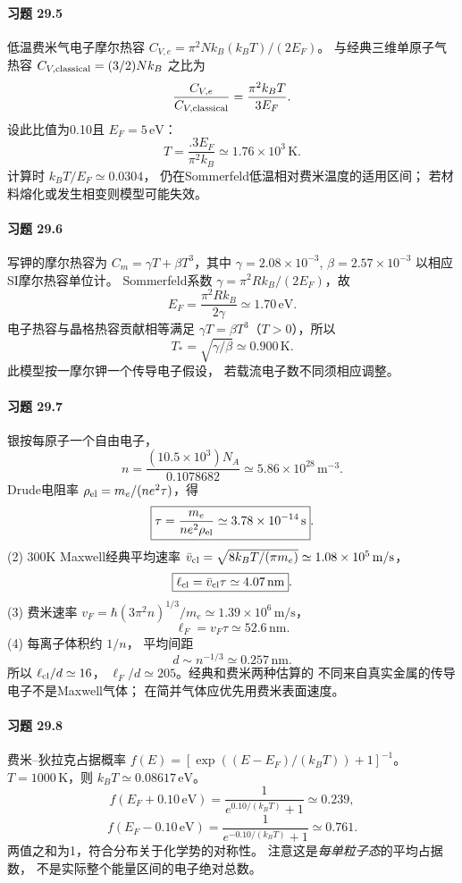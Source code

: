 \paragraph{习题 29.5}
低温费米气电子摩尔热容
\(C_{V,e}=\pi^2Nk_B(k_BT)/(2E_F)\)。
与经典三维单原子气热容
\(C_{V,\rm classical}=(3/2)Nk_B\) 之比为
\[
\frac{C_{V,e}}{C_{V,\rm classical}}
=\frac{\pi^2k_BT}{3E_F}.
\]
设此比值为0.10且 \(E_F=5\,\mathrm{eV}\)：
\[
\boxed{T=\frac{.3 E_F}{\pi^2k_B}
\simeq1.76\times10^3\,\mathrm K}.
\]
计算时 \(k_BT/E_F\simeq0.0304\)，
仍在Sommerfeld低温相对费米温度的适用区间；
若材料熔化或发生相变则模型可能失效。

\paragraph{习题 29.6}
写钾的摩尔热容为
\(C_m=\gamma T+\beta T^3\)，其中
\(\gamma=2.08\times10^{-3}\),
\(\beta=2.57\times10^{-3}\)
以相应SI摩尔热容单位计。
Sommerfeld系数
\(\gamma=\pi^2Rk_B/(2E_F)\)，故
\[
\boxed{E_F=\frac{\pi^2Rk_B}{2\gamma}
\simeq1.70\,\mathrm{eV}}.
\]
电子热容与晶格热容贡献相等满足
\(\gamma T=\beta T^3\)（\(T>0\)），所以
\[
\boxed{T_*=\sqrt{\gamma/\beta}
\simeq0.900\,\mathrm K}.
\]
此模型按一摩尔钾一个传导电子假设，
若载流电子数不同须相应调整。

\paragraph{习题 29.7}
银按每原子一个自由电子，
\[
n=\frac{(10.5\times10^3)N_A}
{0.1078682}\simeq5.86\times10^{28}\,\mathrm{m^{-3}}.
\]
Drude电阻率
\(\rho_{\rm el}=m_e/(ne^2\tau)\)，得
\[
\boxed{\tau=\frac{m_e}{ne^2\rho_{\rm el}}
\simeq3.78\times10^{-14}\,\mathrm s}.
\]
(2) 300K Maxwell经典平均速率
\(\bar v_{\rm cl}=\sqrt{8k_BT/(\pi m_e)}
\simeq1.08\times10^5\,\mathrm{m/s}\)，
\[
\boxed{\ell_{\rm cl}=\bar v_{\rm cl}\tau
\simeq4.07\,\mathrm{nm}}.
\]
(3) 费米速率
\(v_F=\hbar(3\pi^2n)^{1/3}/m_e
\simeq1.39\times10^6\,\mathrm{m/s}\)，
\[
\boxed{\ell_F=v_F\tau\simeq52.6\,\mathrm{nm}}.
\]
(4) 每离子体积约 \(1/n\)，
平均间距
\[
\boxed{d\sim n^{-1/3}\simeq0.257\,\mathrm{nm}}.
\]
所以 \(\ell_{\rm cl}/d\simeq16\)，
\(\ell_F/d\simeq205\)。经典和费米两种估算的
不同来自真实金属的传导电子不是Maxwell气体；
在简并气体应优先用费米表面速度。

\paragraph{习题 29.8}
费米--狄拉克占据概率
\(f(E)=[\exp((E-E_F)/(k_BT))+1]^{-1}\)。
\(T=1000\,\mathrm K\)，则
\(k_BT\simeq0.08617\,\mathrm{eV}\)。
\[
\boxed{f(E_F+0.10\,\mathrm{eV})
=\frac1{e^{0.10/(k_BT)}+1}\simeq0.239},
\]
\[
\boxed{f(E_F-0.10\,\mathrm{eV})
=\frac1{e^{-0.10/(k_BT)}+1}\simeq0.761}.
\]
两值之和为1，符合分布关于化学势的对称性。
注意这是\emph{每单粒子态}的平均占据数，
不是实际整个能量区间的电子绝对总数。


